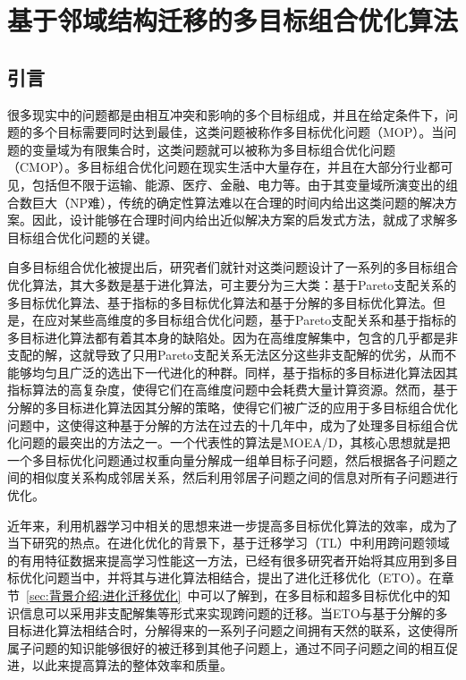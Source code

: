 \chapter{基于邻域结构迁移的多目标组合优化算法}
\label{chap:NST}

\section{引言}
\label{sec:NST:引言}
很多现实中的问题都是由相互冲突和影响的多个目标组成，并且在给定条件下，问题的多个目标需要同时达到最佳，这类问题被称作多目标优化问题（MOP）。当问题的变量域为有限集合时，这类问题就可以被称为多目标组合优化问题（CMOP）。多目标组合优化问题在现实生活中大量存在，并且在大部分行业都可见，包括但不限于运输、能源、医疗、金融、电力等。由于其变量域所演变出的组合数巨大（NP难），传统的确定性算法难以在合理的时间内给出这类问题的解决方案。因此，设计能够在合理时间内给出近似解决方案的启发式方法，就成了求解多目标组合优化问题的关键。
\par
自多目标组合优化被提出后，研究者们就针对这类问题设计了一系列的多目标组合优化算法，其大多数是基于进化算法，可主要分为三大类：基于Pareto支配关系的多目标优化算法\cite{zitzler1999multiobjective,deb2002fast,knowles2000approximating,yang2013grid,laumanns2002combining,hadka2013borg,le2009improved,aguirre2010hybrid,aguirre2013adaptive}、基于指标的多目标优化算法\cite{zitzler2004indicator,bringmann2011approximation,brockhoff20152,rudolph2013evenly,beume2007sms,wagner2007pareto}和基于分解的多目标优化算法\cite{zhang2007moea,zhang2009performance,li2014evolutionary,cheng2016reference,cai2016decomposition,yuan2015balancing}。但是，在应对某些高维度的多目标组合优化问题，基于Pareto支配关系和基于指标的多目标进化算法都有着其本身的缺陷处。因为在高维度解集中，包含的几乎都是非支配的解，这就导致了只用Pareto支配关系无法区分这些非支配解的优劣，从而不能够均匀且广泛的选出下一代进化的种群。同样，基于指标的多目标进化算法因其指标算法的高复杂度，使得它们在高维度问题中会耗费大量计算资源。然而，基于分解的多目标进化算法因其分解的策略，使得它们被广泛的应用于多目标组合优化问题中，这使得这种基于分解的方法在过去的十几年中，成为了处理多目标组合优化问题的最突出的方法之一。一个代表性的算法是MOEA/D\cite{zhang2007moea}，其核心思想就是把一个多目标优化问题通过权重向量分解成一组单目标子问题，然后根据各子问题之间的相似度关系构成邻居关系，然后利用邻居子问题之间的信息对所有子问题进行优化。
\par
近年来，利用机器学习中相关的思想来进一步提高多目标优化算法的效率，成为了当下研究的热点。在进化优化的背景下，基于迁移学习（TL）中利用跨问题领域的有用特征数据来提高学习性能这一方法，已经有很多研究者开始将其应用到多目标优化问题当中，并将其与进化算法相结合，提出了进化迁移优化（ETO）\cite{feng2020explicit,lin2020effective,tan2021evolutionary}。在章节~\ref{sec:背景介绍:进化迁移优化}~中可以了解到，在多目标和超多目标优化中的知识信息可以采用非支配解集等形式来实现跨问题的迁移。当ETO与基于分解的多目标进化算法相结合时，分解得来的一系列子问题之间拥有天然的联系，这使得所属子问题的知识能够很好的被迁移到其他子问题上，通过不同子问题之间的相互促进，以此来提高算法的整体效率和质量。
